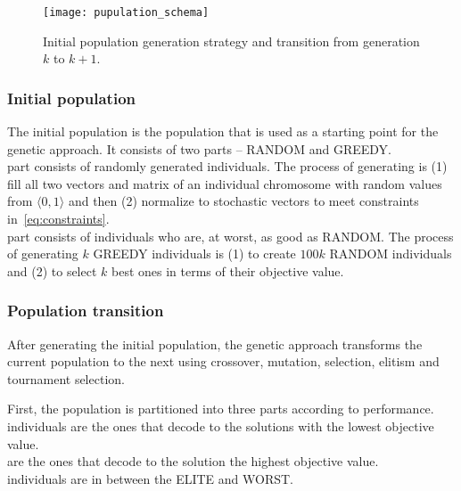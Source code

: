 \begin{figure}[!htp]
    \texttt{[image: pupulation\_schema]}\caption{Initial population generation strategy and transition from generation $k$ to $k+1$.}
    \label{fig:population-schema}
\end{figure}

\subsubsection*{Initial population}
The initial population is the population that is used as a starting point for the genetic approach.
It consists of two parts – RANDOM and GREEDY. \\

 part consists of randomly generated individuals.
The process of generating is (1) fill all two vectors and matrix of an individual chromosome with random values from $\langle 0,1 \rangle$
and then (2) normalize to stochastic vectors to meet constraints in~\ref{eq:constraints}.\\

 part consists of individuals who are, at worst, as good as RANDOM.
The process of generating $k$ GREEDY individuals is (1) to create $100k$ RANDOM individuals and (2) to select $k$ best ones
in terms of their objective value.\\


\subsubsection*{Population transition}
After generating the initial population, the genetic approach transforms the current population
to the next using crossover, mutation, selection, elitism and tournament selection.

First, the population is partitioned into three parts according to performance.\\

 individuals are the ones that decode to the solutions with the lowest objective value.\\

 are the ones that decode to the solution the highest objective value.\\

 individuals are in between the ELITE and WORST.\\

